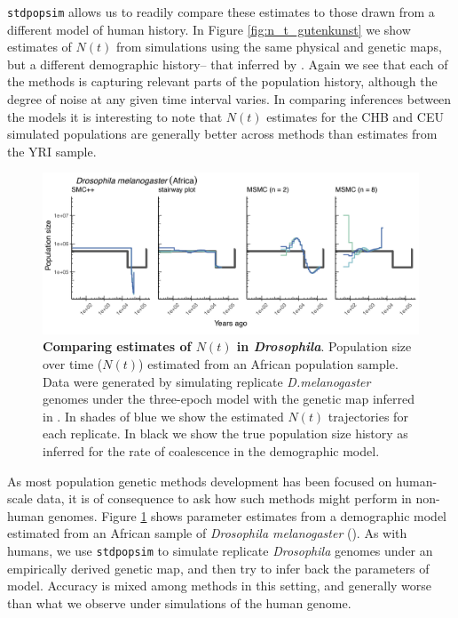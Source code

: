 \documentclass[12pt,halfline,a4paper]{ouparticle}
\newcommand{\stdpopsim}{\texttt{stdpopsim}\xspace}
\begin{document}
\stdpopsim allows us to readily compare these estimates to those drawn from a different
model of human history. In Figure \ref{fig:n_t_gutenkunst} we show estimates of
$N(t)$ from simulations using the same physical and genetic maps, but a different demographic
history-- that inferred by \cite{gutenkunst2009inferring}. Again we see that each
of the methods is capturing relevant parts of the population history, although the
degree of noise at any given time interval varies. In comparing inferences between the
models it is interesting to note that $N(t)$ estimates for the CHB and CEU
simulated populations are generally better across methods than estimates from the YRI
sample.


\begin{figure}
\begin{center}
\includegraphics[width=0.8\linewidth]{display_items/d_mel_Sheehan_mask2.png}
\caption{\textbf{Comparing estimates of $N(t)$ in \emph{Drosophila}}. Population
size over time ($N(t)$) estimated from an African population sample. Data were generated by simulating
replicate \emph{D.melanogaster} genomes under the three-epoch \cite{sheehan2016deep} model
with the genetic map inferred in \cite{comeron2012many}. In shades of blue we show the estimated
$N(t)$ trajectories for each replicate. In black we show the true population size history as inferred
for the rate of coalescence in the demographic model.}
\label{fig:n_t_sheehan}
\end{center}
\end{figure}

As most population genetic methods development has been focused on human-scale
data, it is of consequence to ask how such methods might perform in non-human
genomes. Figure \ref{fig:n_t_sheehan} shows parameter estimates from a demographic
model estimated from an African sample of \emph{Drosophila melanogaster} (\cite{sheehan2016deep}).
As with humans, we use \stdpopsim to simulate replicate \emph{Drosophila} genomes under
an empirically derived genetic map, and then try to infer back the parameters of model.
Accuracy is mixed among methods in this setting, and generally worse than what we
observe under simulations of the human genome.
\end{document}
